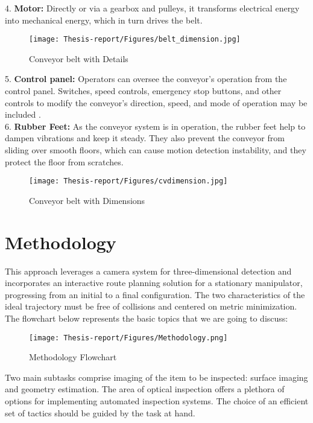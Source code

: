 \documentclass[12pt]{article}
\begin{document}
4.	\textbf {Motor:}
 Directly or via a gearbox and pulleys, it transforms electrical energy into mechanical energy, which in turn drives the belt\cite{ref22}. \\
\begin{figure}[h]
    \centering
    \texttt{[image: Thesis-report/Figures/belt\_dimension.jpg]}
    \caption{Conveyor belt with Details\cite{ref22}}
    \label{fig1:conveyor-belt-with-details}
\end{figure}

5.	\textbf {Control panel:}
 Operators can oversee the conveyor's operation from the control panel. Switches, speed controls, emergency stop buttons, and other controls to modify the conveyor's direction, speed, and mode of operation may be included \cite{ref22}. \\

6.	\textbf{Rubber Feet:}
 As the conveyor system is in operation, the rubber feet help to dampen vibrations and keep it steady.   They also prevent the conveyor from sliding over smooth floors, which can cause motion detection instability, and they protect the floor from scratches\cite{ref22}.\\

\begin{figure}[h]
    \centering
    \texttt{[image: Thesis-report/Figures/cvdimension.jpg]}
    \caption{Conveyor belt with Dimensions\cite{ref22}}
    \label{fig:cv-dimension}
\end{figure}

\section{Methodology}

This approach leverages a camera system for three-dimensional detection and incorporates an interactive route planning solution for a stationary manipulator, progressing from an initial to a final configuration.   The two characteristics of the ideal trajectory must be free of collisions and centered on metric minimization.\\
The flowchart below represents the basic topics that we are going to discuss:
\begin{figure}[H]  %
  \centering
  \texttt{[image: Thesis-report/Figures/Methodology.png]}
  \caption{Methodology Flowchart \cite{ref18}}
  \label{fig:methodology}
\end{figure}

Two main subtasks comprise imaging of the item to be inspected: surface imaging and geometry estimation. The area of optical inspection offers a plethora of options for implementing automated inspection systems. The choice of an efficient set of tactics should be guided by the task at hand. 
\end{document}
